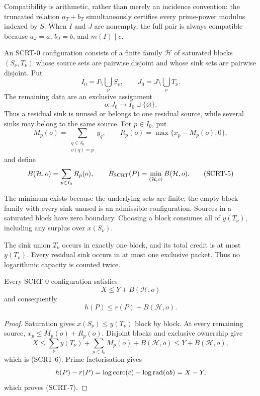 Compatibility is arithmetic, rather than merely an incidence convention:
the truncated relation $a_T+b_T$ simultaneously certifies every prime-power
modulus indexed by $S$.  When $I$ and $J$ are nonempty, the full pair is
always compatible because $a_J=a$, $b_J=b$, and $m(I)\mid c$.

\begin{definition}
An SCRT-0 configuration consists of a finite family $\mathcal H$ of
saturated blocks $(S_\nu,T_\nu)$ whose source sets are pairwise disjoint and
whose sink sets are pairwise disjoint.  Put
\[
 I_0=I\setminus\bigcup_\nu S_\nu,
 \qquad
 J_0=J\setminus\bigcup_\nu T_\nu.
\]
The remaining data are an exclusive assignment
\[
                     o:J_0\longrightarrow I_0\sqcup\{\varnothing\}.
\]
Thus a residual sink is unused or belongs to one residual source, while
several sinks may belong to the same source.  For $p\in I_0$, put
\[
 M_p(o)=\sum_{\substack{q\in J_0\\o(q)=p}}y_q,
 \qquad
 R_p(o)=\max\{x_p-M_p(o),0\},
\]
and define
\[
 B(\mathcal H,o)=\sum_{p\in I_0}R_p(o),
 \qquad
 B_{\rm SCRT}(P)=\min_{(\mathcal H,o)}B(\mathcal H,o).
\tag{SCRT-5}
\]
\end{definition}

The minimum exists because the underlying sets are finite; the empty block
family with every sink unused is an admissible configuration.  Sources in a
saturated block have zero boundary.  Choosing a block consumes all of
$y(T_\nu)$, including any surplus over $x(S_\nu)$.

The sink union $T_\nu$ occurs in exactly one block, and its total credit is
at most $y(T_\nu)$.  Every residual sink occurs in at most one exclusive
packet.  Thus no logarithmic capacity is counted twice.

\begin{proposition}
\label{prop:scrt-height-bridge}
Every SCRT-0 configuration satisfies
\[
                         X\le Y+B(\mathcal H,o)               \tag{SCRT-6}\label{eq:scrt-mass}
\]
and consequently
\[
                         h(P)\le r(P)+B(\mathcal H,o).        \tag{SCRT-7}
\]
\end{proposition}

\begin{proof}
Saturation gives $x(S_\nu)\le y(T_\nu)$ block by block.  At every
remaining source, $x_p\le M_p(o)+R_p(o)$.  Disjoint blocks and exclusive
ownership give
\[
 X\le \sum_\nu y(T_\nu)+\sum_{p\in I_0}M_p(o)
        +B(\mathcal H,o)\le Y+B(\mathcal H,o),
\]
which is (SCRT-6).  Prime factorisation gives
\[
 h(P)-r(P)
 =\log\operatorname{core}(c)-\log\operatorname{rad}(ab)=X-Y,
\]
which proves (SCRT-7).
\end{proof}

